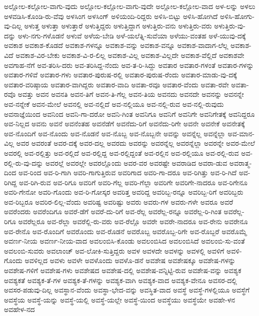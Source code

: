 {ಅಲ್ಲೋಲ-ಕಲ್ಲೋಲ-ವಾಗು-ವುದು
ಅಲ್ಲೋಲ-ಕಲ್ಲೋಲ-ವಾಗು-ವುದೇ
ಅಲ್ಲೋಲ-ಕಲ್ಲೋಲ-ವಾದ
ಅಳ-ಲನ್ನು
ಅಳಲು
ಅಳವಡಿಸಿ-ಕೊಂಡಿ-ರು-ವೆವು
ಅಳಸಿಂಗ
ಅಳಸಿಂಗ್
ಅಳಿಯಂದಿ-ರಿದ್ದರು
ಅಳಿಸಿ-ಬಿಟ್ಟು
ಅಳಿಸಿ-ಹೋಗಿದೆ
ಅಳಿಸಿ-ಹೋಗು-ವು-ದಿಲ್ಲ
ಅಳುತ್ತ
ಅಳುತ್ತಾ
ಅಳುತ್ತಾರೆ
ಅಳುತ್ತಿದ್ದರು
ಅಳುತ್ತಿದ್ದಾಗ
ಅಳುತ್ತಿರು-ವನು
ಅಳುತ್ತಿರು-ವರು
ಅಳುತ್ತಿರು-ವು-ದನ್ನು
ಅಳು-ನಗು-ಗಳೊಡನೆ
ಅಳುವೆ
ಅಳೆಯ-ಬೇಡಿ
ಅಳೆ-ಯಲೆತ್ನಿ-ಸುವೆಯಾ
ಅಳೆಯು-ವಂತಹ
ಅಳೆ-ಯುವು-ದಕ್ಕೆ
ಅವಕಾಶ
ಅವಕಾಶ-ಕೊಡದೆ
ಅವಕಾಶ-ಗಳನ್ನೂ
ಅವಕಾಶ-ವನ್ನು
ಅವಕಾಶ-ವನ್ನೂ
ಅವಕಾಶ-ವಾದಾಗ-ಲೆಲ್ಲ
ಅವಕಾಶ-ವಿದೆ
ಅವಕಾಶ-ವಿರ-ಬೇಕು
ಅವಕಾಶ-ವಿ-ರ-ಲಿಲ್ಲ
ಅವಕಾಶ-ವಿಲ್ಲ
ಅವಕಾಶ-ವಿಲ್ಲದೇ
ಅವಕಾಶ-ವೆಲ್ಲಿದೆ
ಅವಕಾಶವೇ
ಅವಗಾಹ-ನೆಗೆ
ಅವ-ತರಿಸಿ-ದರು
ಅವ-ತರಿಸಿದ್ದ-ನೆಂದು
ಅವ-ತ-ರಿ-ಸಿದ್ದು
ಅವತಾರ
ಅವತಾರ-ಗಳಂತೆ
ಅವತಾರ-ಗಳನ್ನು
ಅವತಾರ-ಗಳಿವೆ
ಅವತಾರ-ಗಳು
ಅವತಾರ-ಪುರುಷ-ರಲ್ಲಿ
ಅವತಾರ-ಪುರುಷ-ರೆಂದು
ಅವತಾರ-ಮಾಡು-ವು-ದಕ್ಕೆ
ಅವತಾರ-ವರಿಷ್ಠಾಯ
ಅವತಾರ-ವಾಗಿದ್ದರು
ಅವತಾರ-ವಾದಿ
ಅವತಾ-ರವೂ
ಅವತಾರ-ವೆಂದು
ಅವತಾ-ರವೇ
ಅವತಾ-ರವೊ
ಅವತ್ತು
ಅವನ
ಅವನತಿ
ಅವನ-ತಿಗೆ
ಅವನ-ತಿ-ಗೆಲ್ಲ
ಅವನ-ತಿಯ
ಅವನದು
ಅವನದೇ
ಅವನನ್ನು
ಅವನನ್ನೇ
ಅವ-ನನ್ನೇಕೆ
ಅವನ-ಮೇಲೆ
ಅವನಲ್ಲಿ
ಅವ-ನಲ್ಲಿದೆ
ಅವ-ನಲ್ಲಿಯೂ
ಅವ-ನಲ್ಲಿ-ರುವ
ಅವ-ನಲ್ಲಿ-ರುವುದು
ಅವನಾಜ್ಞೆಯಿಂದ
ಅವನಿಂದ
ಅವನಿ-ಗಾ-ದರೋ
ಅವನಿ-ಗಿಂತ
ಅವನಿಗೂ
ಅವನಿಗೆ
ಅವನಿಗೇ
ಅವನಿಗೇತಕ್ಕೆ
ಅವನಿದ್ದರೂ
ಅವ-ನಿಲ್ಲದ
ಅವನು
ಅವನೆ
ಅವನೆಂತಹ
ಅವನೆಡೆಗೆ
ಅವನೆದು-ರಿಗೆ
ಅವನೆದು-ರಿಗೇ
ಅವನೇ
ಅವನೇಕೆ
ಅವನೇತಕ್ಕೆ
ಅವ-ನೊಂದಿಗೆ
ಅವ-ನೊಂದು
ಅವ-ನೊಡನೆ
ಅವ-ನೊಬ್ಬ
ಅವ-ನೊಬ್ಬನೇ
ಅವನ್ನು
ಅವನ್ನೆಲ್ಲ
ಅವನ್ನೆಲ್ಲಾ
ಅವ-ಮಾನ-ವಿಲ್ಲ
ಅವರ
ಅವರಂತೆ
ಅವರ-ದಕ್ಕೆ
ಅವರ-ದಲ್ಲ
ಅವರದು
ಅವರನ್ನು
ಅವರನ್ನೆಲ್ಲ
ಅವರನ್ನೆಲ್ಲಾ
ಅವರನ್ನೇ
ಅವರ-ಮೇಲೆ
ಅವರಲ್ಲಿ
ಅವ-ರಲ್ಲಿತ್ತು
ಅವ-ರಲ್ಲಿದೆ
ಅವ-ರಲ್ಲಿದ್ದ
ಅವ-ರಲ್ಲಿದ್ದಂತೆ
ಅವ-ರಲ್ಲಿನ
ಅವ-ರಲ್ಲಿಯೂ
ಅವ-ರಲ್ಲಿ-ರುವ
ಅವ-ರಲ್ಲಿ-ರು-ವು-ದನ್ನು
ಅವರಲ್ಲೆ
ಅವರಲ್ಲೇ
ಅವರಲ್ಲೊಂದು
ಅವರ-ವರ
ಅವರಷ್ಟೇ
ಅವರಾಡಿದ
ಅವರಾ-ಡುವ
ಅವರಾತ್ಮ-ದಿಂದ
ಅವ-ರಿಂದ
ಅವ-ರಿ-ಗಾಗಿ
ಅವರಿ-ಗಾಗುತ್ತಿರುವ
ಅವರಿಗಾದ
ಅವರಿ-ಗಾ-ದರೂ
ಅವ-ರಿಗಿತ್ತು
ಅವ-ರಿ-ಗಿದೆ
ಅವ-ರಿಗಿದ್ದ
ಅವ-ರಿಗಿ-ರುವ
ಅವ-ರಿಗೂ
ಅವರಿಗೆ
ಅವರಿ-ಗೆಲ್ಲ
ಅವರಿ-ಗೆಲ್ಲಾ
ಅವರಿಗೇ
ಅವರಿಗೇ-ನಾದರೂ
ಅವ-ರಿಗೇನೂ
ಅವರಿ-ಗೇನೋ
ಅವರಿ-ಗೊಂದು
ಅವ-ರಿ-ಗೋಸ್ಕರ
ಅವರಿತ್ತ
ಅವರಿದ್ದ
ಅವರಿಬ್ಬ-ರನ್ನೂ
ಅವರಿಬ್ಬ-ರಿಗೆ
ಅವರಿಬ್ಬರು
ಅವ-ರಿಬ್ಬರೂ
ಅವರಿರ-ಲಿಲ್ಲ-ವೆಂದು
ಅವರಿಷ್ಟ
ಅವರಿಷ್ಟು
ಅವರು
ಅವರು-ಗಳ
ಅವರು-ಗಳೇ
ಅವರೂ
ಅವರೆ
ಅವರೆಂದರು
ಅವರೆಂದಿಗೂ
ಅವರೆ-ಡೆಗೆ
ಅವರೆ-ದು-ರಿಗೆ
ಅವ-ರೆಲ್ಲ
ಅವರೆಲ್ಲ-ರನ್ನೂ
ಅವರೆಲ್ಲ-ರಿ-ಗಿಂತ
ಅವರೆಲ್ಲ-ರಿಗೂ
ಅವರೆಲ್ಲರೂ
ಅವ-ರೆಲ್ಲಾ
ಅವರೆಲ್ಲಿ-ರು-ವರು
ಅವ-ರೆಲ್ಲೊ
ಅವರೇ
ಅವರೇ-ನಾದರೂ
ಅವ-ರೇನು
ಅವರೇನೂ
ಅವ-ರೇನೊ
ಅವ-ರೊಂದಿಗೆ
ಅವರೊಂದು
ಅವ-ರೊಡನೆ
ಅವರೊಬ್ಬ
ಅವರೊಬ್ಬ-ರಿಗೇ
ಅವ-ರೊಬ್ಬರೆ
ಅವರೊಮ್ಮೆ
ಅವರ್ಣ-ನೀಯ
ಅವರ್ಣ-ನೀಯ-ವಾದ
ಅವಲಂಬಿಸಿ-ಕೊಂಡು
ಅವಲಂಬಿಸಿದ
ಅವಲಂಬಿಸಿದೆ
ಅವಲಂಬಿ-ಸು-ವಂತೆ
ಅವಲಂಬಿ-ಸುವರು
ಅವಲಾಂಚ್
ಅವ-ಲೋಕಿ-ಸುತ್ತಿದ್ದರು
ಅವಳ
ಅವಳದೇ
ಅವಳನ್ನು
ಅವಳಲ್ಲಿ
ಅವಳಿಗೆ
ಅವಳಿ-ಗೊಂದು
ಅವಳಿಲ್ಲದ
ಅವಳು
ಅವಳೇ
ಅವಳೊಂದು
ಅವಳೊ-ಡನೆ
ಅವಶೇಷ
ಅವಶೇಷಕ್ಕೂ
ಅವಶೇಷ-ಗಳನ್ನು
ಅವಶೇಷ-ಗಳಿಗೆ
ಅವಶೇಷ-ಗಳು
ಅವಶೇಷದ
ಅವಶೇಷ-ದಲ್ಲಿ
ಅವಶೇಷ-ವನ್ನಿಟ್ಟಿ-ರುವ
ಅವಶೇಷ-ವನ್ನು
ಅವಶ್ಯಕ
ಅವಶ್ಯಕತೆ
ಅವಶ್ಯಕ-ತೆ-ಗಳ
ಅವಶ್ಯಕ-ತೆ-ಗಳನ್ನು
ಅವಶ್ಯಕ-ವಾಗಿ
ಅವಶ್ಯಕ-ವಾದ
ಅವಶ್ಯಕ-ವೇನೂ
ಅವಸರ-ದಲ್ಲಿ
ಅವಸರ-ಪಡುವು-ದಿಲ್ಲ
ಅವಸ್ಥಾನ-ವೆಂದು
ಅವಸ್ಥಾ-ಭೇದ-ವನ್ನು
ಅವಸ್ಥಿತ-ವಾದ
ಅವಸ್ಥೆ
ಅವಸ್ಥೆ-ಗಳಲ್ಲಿಯೂ
ಅವಸ್ಥೆಗೆ
ಅವಸ್ಥೆಯ
ಅವಸ್ಥೆ-ಯನ್ನು
ಅವಸ್ಥೆ-ಯಲ್ಲಿ
ಅವಸ್ಥೆ-ಯಲ್ಲೇ
ಅವಸ್ಥೆ-ಯಿಂದ
ಅವಸ್ಥೆಯು
ಅವಸ್ಥೆಯೇ
ಅವಹೇ-ಳನ
ಅವಹೇಳ-ನದ
}
